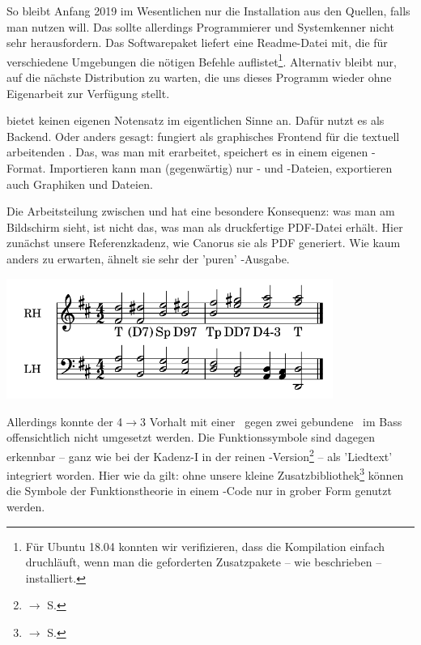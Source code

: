 So bleibt Anfang 2019 im Wesentlichen nur die Installation aus den Quellen,
falls man  nutzen will. Das sollte allerdings Programmierer und
Systemkenner nicht sehr herausfordern. Das Softwarepaket liefert eine
Readme-Datei mit, die für verschiedene Umgebungen die nötigen Befehle
auflistet\footnote{Für Ubuntu 18.04 konnten wir verifizieren, dass die
Kompilation einfach druchläuft, wenn man die geforderten Zusatzpakete -- wie
beschrieben -- installiert.}. Alternativ bleibt nur, auf die nächste
Distribution zu warten, die uns dieses Programm wieder ohne Eigenarbeit zur
Verfügung stellt.

 bietet keinen eigenen Notensatz im eigentlichen Sinne an. Dafür
nutzt es  als Backend. Oder anders gesagt:  fungiert
als graphisches Frontend für die textuell arbeitenden . Das, was
man mit  erarbeitet, speichert es in einem eigenen
-Format. Importieren kann man (gegenwärtig) nur - und
-Dateien, exportieren auch Graphiken und Dateien.

Die Arbeitsteilung zwischen  und  hat eine besondere
Konsequenz: was man am Bildschirm sieht, ist nicht das, was man als druckfertige
PDF-Datei erhält. Hier zunächst unsere Referenzkadenz, wie Canorus sie als PDF
generiert. Wie kaum anders zu erwarten, ähnelt sie sehr der 'puren'
-Ausgabe.

\begin{center}
\includegraphics[width=0.8\textwidth]{frontends/cantorus/cadenca2-pdf.png}
\end{center}

Allerdings konnte der 4$\rightarrow$3 Vorhalt mit einer \Halb\ gegen zwei
gebundene \Vier\ im Bass offensichtlich nicht umgesetzt werden. Die
Funktionssymbole sind dagegen erkennbar -- ganz wie bei der Kadenz-I in der
reinen -Version\footnote{$\rightarrow$ S.
\pageref{LilyPondKadenzI}} -- als 'Liedtext' integriert worden. Hier wie da
gilt: ohne unsere kleine Zusatzbibliothek\footnote{$\rightarrow$ S.
\pageref{LilyPondFuncTheory}} können die Symbole der Funktionstheorie in einem
-Code nur in grober Form genutzt werden.

